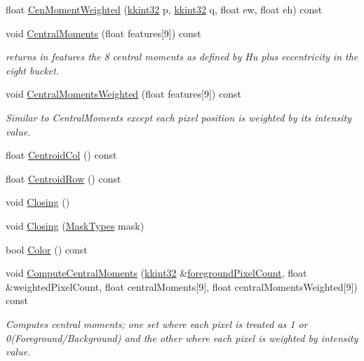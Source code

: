 \begin{DoxyCompactItemize}
\item 
float \hyperlink{class_k_k_b_1_1_raster_a0f7f7ed827eb8b676c3ea3aea427a49c}{Cen\+Moment\+Weighted} (\hyperlink{namespace_k_k_b_a8fa4952cc84fda1de4bec1fbdd8d5b1b}{kkint32} p, \hyperlink{namespace_k_k_b_a8fa4952cc84fda1de4bec1fbdd8d5b1b}{kkint32} q, float ew, float eh) const 
\item 
void \hyperlink{class_k_k_b_1_1_raster_a48d9a6e24ed721effc322d9b3bb7ab7d}{Central\+Moments} (float features\mbox{[}9\mbox{]}) const 
\begin{DoxyCompactList}\small\item\em returns in \textquotesingle{}features\textquotesingle{} the 8 central moments as defined by Hu plus eccentricity in the eight bucket. \end{DoxyCompactList}\item 
void \hyperlink{class_k_k_b_1_1_raster_a8fdeeeb015d5ab1b6f481f6c6a21dd9b}{Central\+Moments\+Weighted} (float features\mbox{[}9\mbox{]}) const 
\begin{DoxyCompactList}\small\item\em Similar to \textquotesingle{}Central\+Moments\textquotesingle{} except each pixel position is weighted by its intensity value. \end{DoxyCompactList}\item 
float \hyperlink{class_k_k_b_1_1_raster_a27438047c266b2a207918a60831b0677}{Centroid\+Col} () const 
\item 
float \hyperlink{class_k_k_b_1_1_raster_ab74f32c36bb08f11b52e748527052c20}{Centroid\+Row} () const 
\item 
void \hyperlink{class_k_k_b_1_1_raster_a94fed3ca0f4c163500235447a44f3067}{Closing} ()
\item 
void \hyperlink{class_k_k_b_1_1_raster_ae87534cc6246107a595083c08f9130fa}{Closing} (\hyperlink{class_k_k_b_1_1_morph_op_a9eaa0383bf9e046da208af397e7e35eb}{Mask\+Types} mask)
\item 
bool \hyperlink{class_k_k_b_1_1_raster_a644248f99009d64ac4b8fef4a22aff25}{Color} () const 
\item 
void \hyperlink{class_k_k_b_1_1_raster_aba990cd9fd39b7804863b6d4cad39f05}{Compute\+Central\+Moments} (\hyperlink{namespace_k_k_b_a8fa4952cc84fda1de4bec1fbdd8d5b1b}{kkint32} \&\hyperlink{class_k_k_b_1_1_raster_aa7e86253f4b9c347da718732e44b60e8}{foreground\+Pixel\+Count}, float \&weighted\+Pixel\+Count, float central\+Moments\mbox{[}9\mbox{]}, float central\+Moments\+Weighted\mbox{[}9\mbox{]}) const 
\begin{DoxyCompactList}\small\item\em Computes central moments; one set where each pixel is treated as 1 or 0(Foreground/\+Background) and the other where each pixel is weighted by intensity value. \end{DoxyCompactList}\item 

\end{DoxyCompactItemize}
